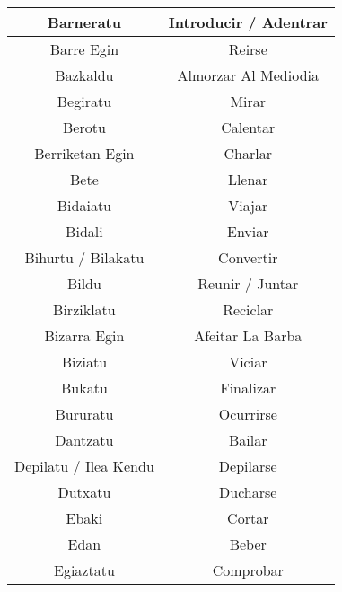 \documentclass[11pt, a4paper]{article}
\begin{document}
\begin{longtable}{cc}
    Barneratu                     & Introducir / Adentrar          \\
    \hline
    Barre Egin                    & Reirse                         \\
    \hline
    Bazkaldu                      & Almorzar Al Mediodia           \\
    \hline
    Begiratu                      & Mirar                          \\
    \hline
    Berotu                        & Calentar                       \\
    \hline
    Berriketan Egin               & Charlar                        \\
    \hline
    Bete                          & Llenar                         \\
    \hline
    Bidaiatu                      & Viajar                         \\
    \hline
    Bidali                        & Enviar                         \\
    \hline
    Bihurtu / Bilakatu            & Convertir                      \\
    \hline
    Bildu                         & Reunir / Juntar                \\
    \hline
    Birziklatu                    & Reciclar                       \\
    \hline
    Bizarra Egin                  & Afeitar La Barba               \\
    \hline
    Biziatu                       & Viciar                         \\
    \hline
    Bukatu                        & Finalizar                      \\
    \hline
    Bururatu                      & Ocurrirse                      \\
    \hline
    Dantzatu                      & Bailar                         \\
    \hline
    Depilatu / Ilea Kendu         & Depilarse                      \\
    \hline
    Dutxatu                       & Ducharse                       \\
    \hline
    Ebaki                         & Cortar                         \\
    \hline
    Edan                          & Beber                          \\
    \hline
    Egiaztatu                     & Comprobar                      \\

\end{longtable}
\end{document}
